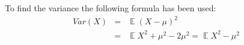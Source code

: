 \documentclass{article}\usepackage[]{graphicx}\usepackage[]{color}
\begin{document}
To find the variance the following formula has been used:
\begin{equation}
\begin{array}{lll}
Var(X) & = & \mathop{\mathbb{E}}(X - \mu)^2 \\
& = & \mathop{\mathbb{E}}X^2 + \mu^2 - 2\mu^2 = \mathop{\mathbb{E}}X^2 - \mu^2
\end{array}
\end{equation}

   
\end{document}
